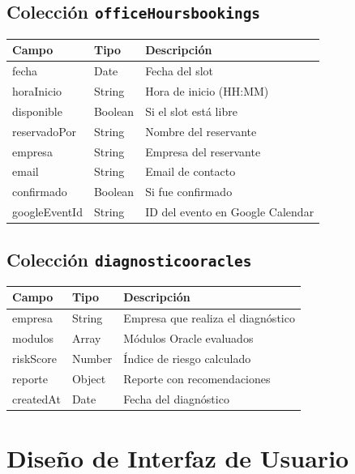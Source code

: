 \documentclass[12pt, a4paper, twoside]{report}
\begin{document}
\subsection*{Colección \texttt{officeHoursbookings}}
\begin{center}
\begin{tabular}{L{3.5cm} L{3cm} L{6.5cm}}
  \toprule
  \textbf{Campo} & \textbf{Tipo} & \textbf{Descripción} \\
  \midrule
  fecha           & Date    & Fecha del slot \\
  horaInicio      & String  & Hora de inicio (HH:MM) \\
  disponible      & Boolean & Si el slot está libre \\
  reservadoPor    & String  & Nombre del reservante \\
  empresa         & String  & Empresa del reservante \\
  email           & String  & Email de contacto \\
  confirmado      & Boolean & Si fue confirmado \\
  googleEventId   & String  & ID del evento en Google Calendar \\
  \bottomrule
\end{tabular}
\end{center}

\subsection*{Colección \texttt{diagnosticooracles}}
\begin{center}
\begin{tabular}{L{3cm} L{3.5cm} L{6.5cm}}
  \toprule
  \textbf{Campo} & \textbf{Tipo} & \textbf{Descripción} \\
  \midrule
  empresa     & String  & Empresa que realiza el diagnóstico \\
  modulos     & Array   & Módulos Oracle evaluados \\
  riskScore   & Number  & Índice de riesgo calculado \\
  reporte     & Object  & Reporte con recomendaciones \\
  createdAt   & Date    & Fecha del diagnóstico \\
  \bottomrule
\end{tabular}
\end{center}

\section{Diseño de Interfaz de Usuario}
\end{document}
